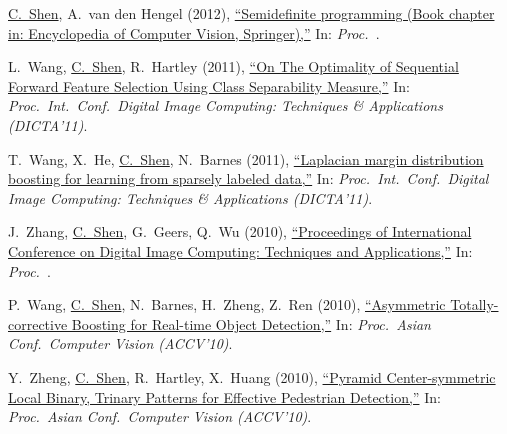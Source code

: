\documentclass[9pt, a4paper]{article}
\newcommand{\years}[1]{\marginnote{\scriptsize #1}}
\def\highlight{\uline}
\begin{document}
\medskip

\years{2012} \highlight{C.~Shen}, A.~van den Hengel (2012),
\href{http://www.google.com/search?lr=&ie=UTF-8&oe=UTF-8&q=Semidefinite+programming+%28Book+chapter+in%3A+Encyclopedia+of+Computer+Vision%2C+Springer%29+Chunhua+Shen%2C+Anton+van+den+Hengel}{``Semidefinite programming (Book chapter in: Encyclopedia of Computer Vision, Springer),{}''}
In: \emph{Proc.\ }.

\medskip

\years{2011} L.~Wang, \highlight{C.~Shen}, R.~Hartley (2011),
\href{http://www.google.com/search?lr=&ie=UTF-8&oe=UTF-8&q=On+The+Optimality+of+Sequential+Forward+Feature+Selection+Using+Class+Separability+Measure+Lei+Wang%2C+Chunhua+Shen%2C+Richard+Hartley}{``On The Optimality of Sequential Forward Feature Selection Using Class Separability Measure,{}''}
In: \emph{Proc.\ Int.\ Conf.\  Digital Image Computing: Techniques \& Applications (DICTA'11)}.

\medskip

\years{2011} T.~Wang, X.~He, \highlight{C.~Shen}, N.~Barnes (2011),
\href{http://www.google.com/search?lr=&ie=UTF-8&oe=UTF-8&q=Laplacian+margin+distribution+boosting+for+learning+from+sparsely+labeled+data+Tao+Wang%2C+Xuming+He%2C+Chunhua+Shen%2C+Nick+Barnes}{``Laplacian margin distribution boosting for learning from sparsely labeled data,{}''}
In: \emph{Proc.\ Int.\ Conf.\  Digital Image Computing: Techniques \& Applications (DICTA'11)}.

\medskip

\years{2010} J.~Zhang, \highlight{C.~Shen}, G.~Geers, Q.~Wu (2010),
\href{http://www.google.com/search?lr=&ie=UTF-8&oe=UTF-8&q=Proceedings+of+International+Conference+on+Digital+Image+Computing%3A+Techniques+and+Applications+Jian+Zhang%2C+Chunhua+Shen%2C+Glen+Geers%2C+Qiang+Wu}{``Proceedings of International Conference on Digital Image Computing: Techniques and Applications,{}''}
In: \emph{Proc.\ }.

\medskip

\years{2010} P.~Wang, \highlight{C.~Shen}, N.~Barnes, H.~Zheng, Z.~Ren (2010),
\href{http://www.google.com/search?lr=&ie=UTF-8&oe=UTF-8&q=Asymmetric+Totally-corrective+Boosting+for+Real-time+Object+Detection+Peng+Wang%2C+Chunhua+Shen%2C+Nick+Barnes%2C+Hong+Zheng%2C+Zhang+Ren}{``Asymmetric Totally-corrective Boosting for Real-time Object Detection,{}''}
In: \emph{Proc.\ Asian Conf.\  Computer Vision (ACCV'10)}.

\medskip

\years{2010} Y.~Zheng, \highlight{C.~Shen}, R.~Hartley, X.~Huang (2010),
\href{http://www.google.com/search?lr=&ie=UTF-8&oe=UTF-8&q=Pyramid+Center-symmetric+Local+Binary%2C+Trinary+Patterns+for+Effective+Pedestrian+Detection+Yongbin+Zheng%2C+Chunhua+Shen%2C+Richard+Hartley%2C+Xinsheng+Huang}{``Pyramid Center-symmetric Local Binary, Trinary Patterns for Effective Pedestrian Detection,{}''}
In: \emph{Proc.\ Asian Conf.\  Computer Vision (ACCV'10)}.
\end{document}
